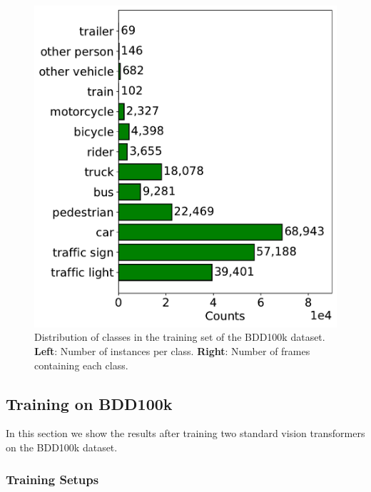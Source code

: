 \begin{figure}
\begin{minipage}{0.49\textwidth}
        \includegraphics[width=\textwidth]{images/bdd100k/frame_counts.pdf}
    \end{minipage}
    \caption[Distribution of classes in the training set of the BDD100k dataset.]
    {Distribution of classes in the training set of the BDD100k dataset.
    \textbf{Left}: Number of instances per class. 
    \textbf{Right}: Number of frames containing each class.
    }
    \label{fig:bdd100k_distribution}
\end{figure}

\subsection{Training on BDD100k}
In this section we show the results after training two standard vision transformers 
on the BDD100k dataset.

\subsubsection{Training Setups}

